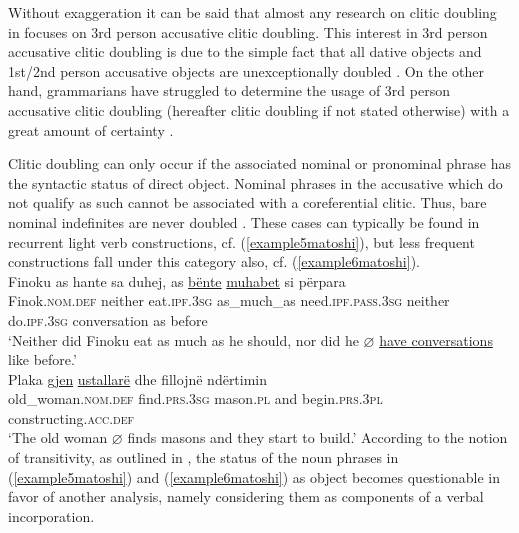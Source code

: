 \documentclass[output=paper]{langsci/langscibook}
\begin{document}
Without exaggeration it can be said that almost any research on clitic doubling in  focuses on 3rd person accusative clitic doubling. This interest in 3rd person accusative clitic doubling is due to the simple fact that all dative objects and 1st/2nd person accusative objects are unexceptionally doubled \citep[444]{Buchholz1987}. On the other hand, grammarians have struggled to determine the usage of 3rd person accusative clitic doubling (hereafter clitic doubling if not stated otherwise) with a great amount of certainty \citep[3--4]{Buchholz1977}.

Clitic doubling can only occur if the associated nominal or pronominal phrase has the syntactic status of direct object. Nominal phrases in the accusative which do not qualify as such cannot be associated with a coreferential clitic. Thus, bare nominal indefinites are never doubled \citep{Kallulli2016}. These cases can typically be found in recurrent light verb constructions, cf. (\ref{example5matoshi}), but less frequent constructions fall under this category also, cf. (\ref{example6matoshi}).    
\ea \label{example5matoshi} 
	\\
	\gll Finoku as hante sa duhej, as \uline{bënte} \uline{muhabet} si përpara \\
	Finok.\textsc{nom.def} neither eat.\textsc{ipf.3sg} as\_much\_as need.\textsc{ipf.pass.3sg} neither do.\textsc{ipf.3sg} conversation as before \\
	\glt ‘Neither did Finoku eat as much as he should, nor did he $\varnothing$ \uline{have conversations} like before.’
\ex \label{example6matoshi} 
	\\
	\gll Plaka \uline{gjen} \uline{ustallarë} dhe fillojnë ndërtimin\\
	old\_woman\textsc{.nom.def} find.\textsc{prs.3sg} mason.\textsc{pl} and begin.\textsc{prs.3pl} constructing.\textsc{acc.def}\\
	\glt ‘The old woman $\varnothing$ finds masons and they start to build.’
 \z
According to the notion of transitivity, as outlined in , the status of the noun phrases in (\ref{example5matoshi}) and (\ref{example6matoshi}) as object becomes questionable in favor of another analysis, namely considering them as components of a verbal incorporation.\largerpage[2]
\end{document}
